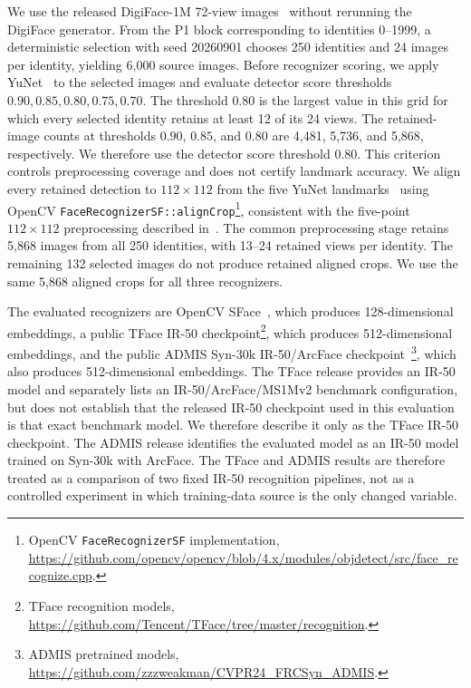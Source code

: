 \documentclass[journal]{IEEEtran}
\begin{document}
\begin{bibunit}
We use the released DigiFace-1M 72-view images~\cite{bae2023digiface1m} without rerunning the DigiFace generator. From the P1 block corresponding to identities 0--1999, a deterministic selection with seed 20260901 chooses 250 identities and 24 images per identity, yielding 6,000 source images. Before recognizer scoring, we apply YuNet~\cite{wu2023yunet} to the selected images and evaluate detector score thresholds $0.90,0.85,0.80,0.75,0.70$. The threshold $0.80$ is the largest value in this grid for which every selected identity retains at least 12 of its 24 views. The retained-image counts at thresholds $0.90$, $0.85$, and $0.80$ are 4,481, 5,736, and 5,868, respectively. We therefore use the detector score threshold $0.80$. This criterion controls preprocessing coverage and does not certify landmark accuracy. We align every retained detection to $112\times112$ from the five YuNet landmarks~\cite{wu2023yunet} using OpenCV \texttt{FaceRecognizerSF::alignCrop}\footnote{OpenCV \texttt{FaceRecognizerSF} implementation, \url{https://github.com/opencv/opencv/blob/4.x/modules/objdetect/src/face_recognize.cpp}.}, consistent with the five-point $112\times112$ preprocessing described in~\cite{deng2019arcface}. The common preprocessing stage retains 5,868 images from all 250 identities, with 13--24 retained views per identity. The remaining 132 selected images do not produce retained aligned crops. We use the same 5,868 aligned crops for all three recognizers.

The evaluated recognizers are OpenCV SFace~\cite{zhong2021sface}, which produces 128-dimensional embeddings, a public TFace IR-50 checkpoint\footnote{TFace recognition models, \url{https://github.com/Tencent/TFace/tree/master/recognition}.}, which produces 512-dimensional embeddings, and the public ADMIS Syn-30k IR-50/ArcFace checkpoint~\cite{deng2019arcface,deandres2024frcsyn}\footnote{ADMIS pretrained models, \url{https://github.com/zzzweakman/CVPR24_FRCSyn_ADMIS}.}, which also produces 512-dimensional embeddings. The TFace release provides an IR-50 model and separately lists an IR-50/ArcFace/MS1Mv2 benchmark configuration, but does not establish that the released IR-50 checkpoint used in this evaluation is that exact benchmark model. We therefore describe it only as the TFace IR-50 checkpoint. The ADMIS release identifies the evaluated model as an IR-50 model trained on Syn-30k with ArcFace. The TFace and ADMIS results are therefore treated as a comparison of two fixed IR-50 recognition pipelines, not as a controlled experiment in which training-data source is the only changed variable.


\end{bibunit}
\end{document}
